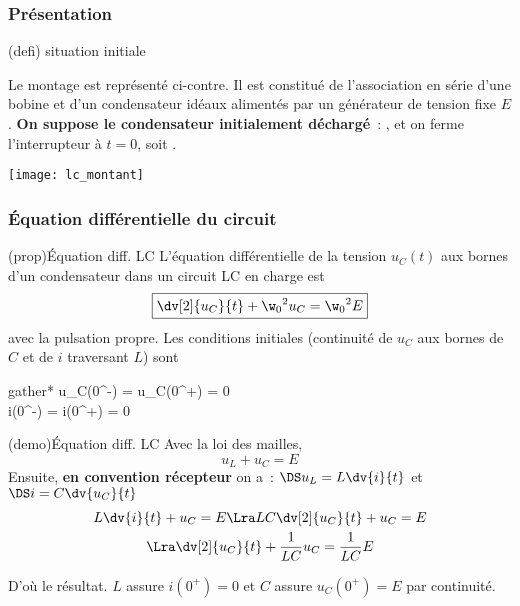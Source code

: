 \documentclass[../../main/main.tex]{subfiles}
\begin{document}
\subsubsection{Présentation}
\begin{tcb}[label=def:echelonC, sidebyside, righthand width=.4\linewidth](defi)
	{situation initiale}

	Le montage est représenté ci-contre. Il est constitué de l'association en
	série d'une bobine et d'un condensateur idéaux alimentés par un générateur
	de tension fixe $E$. \textbf{On suppose le condensateur initialement
		déchargé}~: , et on ferme l'interrupteur à $t=0$, soit
	.

	\tcblower
	\begin{center}
		\texttt{[image: lc\_montant]}
	\end{center}
\end{tcb}

\vspace*{-15pt}
\subsubsection{Équation différentielle du circuit}
\begin{tcbraster}[raster columns=2, raster equal height=rows]
	\begin{tcb}[label=prop:eqdiffrc](prop){Équation diff. LC}
		L'équation différentielle de la tension $u_C(t)$ aux bornes d'un
		condensateur dans un circuit LC en charge est
		\[ \boxed{\dv[2]{u_C}{t} + \w_0{}^2u_C = \w_0{}^2E}\]
		avec  la pulsation propre.
		\tcblower
		Les conditions initiales (continuité de $u_C$ aux bornes de $C$
		et de $i$ traversant $L$) sont
		\begin{empheq}[box=\fbox]{gather*}
			u_C(0^-) = u_C(0^+) = 0\\
			i(0^-) = i(0^+) = 0
		\end{empheq}
	\end{tcb}
	\begin{tcb}[label=demo:eqdiffrc](demo){Équation diff. LC}
		Avec la loi des mailles,
		$$u_L + u_C = E$$
		Ensuite, \textbf{en convention récepteur} on a~:
		$\DS u_L = L \dv{i}{t}$ et $\DS i = C \dv{u_C}{t}$
		\begin{gather*}
			L \dv{i}{t} + u_C                                = E
			\Lra LC \dv[2]{u_C}{t} + u_C          = E\\
			\Lra \dv[2]{u_C}{t} + \frac{1}{LC}u_C = \frac{1}{LC}E
		\end{gather*}

		D'où le résultat. $L$ assure $i(0^+) = 0$ et $C$ assure $u_C(0^+) = E$
		par continuité.
	\end{tcb}
\end{tcbraster}
\end{document}
